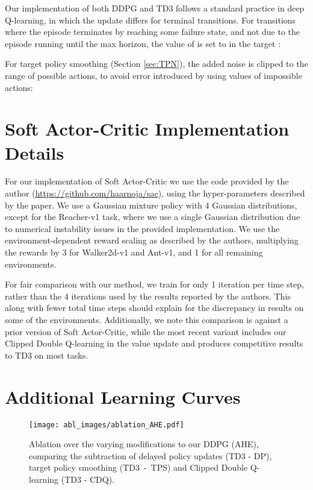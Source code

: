 \documentclass{article}
\begin{document}
Our implementation of both DDPG and TD3 follows a standard practice in deep Q-learning, in which the update differs for terminal transitions. For transitions where the episode terminates by reaching some failure state, and not due to the episode running until the max horizon, the value of  is set to  in the target : 


For target policy smoothing (Section \ref{sec:TPN}), the added noise is clipped to the range of possible actions, to avoid error introduced by using values of impossible actions: 




\section{Soft Actor-Critic Implementation Details}


For our implementation of Soft Actor-Critic \cite{haarnoja2018soft} we use the code provided by the author (\url{https://github.com/haarnoja/sac}), using the hyper-parameters described by the paper. We use a Gaussian mixture policy with 4 Gaussian distributions, except for the Reacher-v1 task, where we use a single Gaussian distribution due to numerical instability issues in the provided implementation. We use the environment-dependent reward scaling as described by the authors, multiplying the rewards by 3 for Walker2d-v1 and Ant-v1, and 1 for all remaining environments. 

For fair comparison with our method, we train for only 1 iteration per time step, rather than the 4 iterations used by the results reported by the authors. This along with fewer total time steps should explain for the discrepancy in results on some of the environments. Additionally, we note this comparison is against a prior version of Soft Actor-Critic, while the most recent variant includes our Clipped Double Q-learning in the value update and produces competitive results to TD3 on most tasks. 

\clearpage

\section{Additional Learning Curves} \label{sec:sm_curves}


\begin{figure*}[h]
\centering
\captionsetup[subfloat]{captionskip=-10pt}
\texttt{[image: abl\_images/ablation\_AHE.pdf]}
\subfloat[HalfCheetah-v1]{\hspace{.28\linewidth}}
\subfloat[Hopper-v1]{\hspace{.24\linewidth}}
\subfloat[Walker2d-v1]{\hspace{.24\linewidth}}
\subfloat[Ant-v1]{\hspace{.24\linewidth}}
\caption{Ablation over the varying modifications to our DDPG (AHE), comparing the subtraction of delayed policy updates (TD3 - DP), target policy smoothing \mbox{(TD3 - TPS)} and Clipped Double Q-learning (TD3 - CDQ).}
\label{fig:ablation}
\end{figure*}
\end{document}

